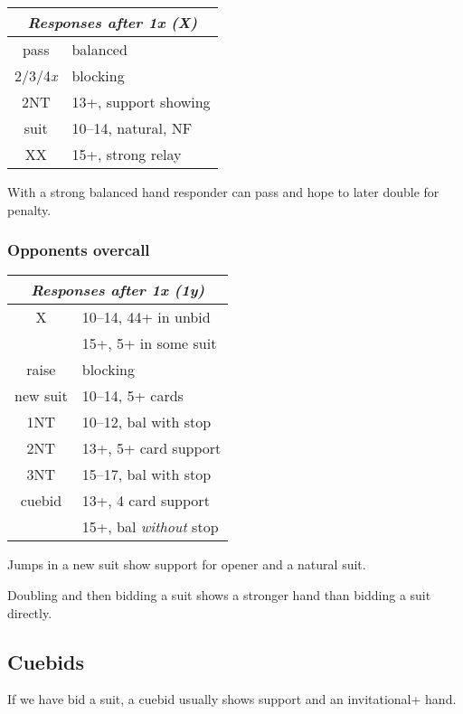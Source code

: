 \documentclass[a4paper, twoside, 11pt]{article}
\begin{document}
\begin{multicols}{3}
\begin{center}
\begin{tabular}{ |c|l| }
 \hline
 \multicolumn{2}{|c|}{\textit{Responses after 1x (X)}} \\
 \hline
 pass & balanced\\
 2/3/4\textit{x} &  blocking\\
 2NT & 13+, support showing\\
 suit & 10--14, natural, NF\\
 XX & 15+, strong relay\\
 \hline
\end{tabular}
\end{center}

With a strong balanced hand responder can pass and hope to later double for penalty.

\subsubsection*{Opponents overcall}

\begin{center}
\begin{tabular}{ |c|l| }
 \hline
 \multicolumn{2}{|c|}{\textit{Responses after 1x (1y)}} \\
 \hline
 X & 10--14, 44+ in unbid\\
  & 15+, 5+ in some suit\\
 raise &  blocking\\
 new suit & 10--14, 5+ cards\\
 1NT & 10--12, bal with stop \\
 2NT & 13+, 5+ card support\\
 3NT & 15--17, bal with stop \\
 cuebid & 13+, 4 card support \\
     & 15+, bal \textit{without} stop\\
 \hline
\end{tabular}
\end{center}

Jumps in a new suit show support for opener and a natural suit.

Doubling and then bidding a suit shows a stronger hand than bidding a suit directly.


\subsection*{Cuebids}
If we have bid a suit, a cuebid usually shows support and an invitational+ hand.


\end{multicols}
\end{document}
